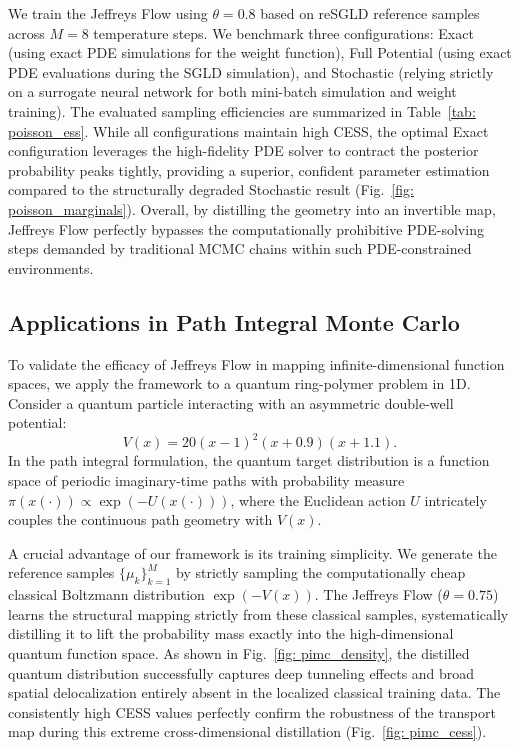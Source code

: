 \documentclass[%
 reprint,
 amsmath,amssymb,
 aps,
 pre,
]{revtex4-2}
\begin{document}
We train the Jeffreys Flow using $\theta = 0.8$ based on reSGLD reference samples across $M = 8$ temperature steps. We benchmark three configurations: Exact (using exact PDE simulations for the weight function), Full Potential (using exact PDE evaluations during the SGLD simulation), and Stochastic (relying strictly on a surrogate neural network for both mini-batch simulation and weight training). The evaluated sampling efficiencies are summarized in Table~\ref{tab: poisson_ess}. While all configurations maintain high CESS, the optimal Exact configuration leverages the high-fidelity PDE solver to contract the posterior probability peaks tightly, providing a superior, confident parameter estimation compared to the structurally degraded Stochastic result (Fig.~\ref{fig: poisson_marginals}). Overall, by distilling the geometry into an invertible map, Jeffreys Flow perfectly bypasses the computationally prohibitive PDE-solving steps demanded by traditional MCMC chains within such PDE-constrained environments.

\subsection{Applications in Path Integral Monte Carlo}

To validate the efficacy of Jeffreys Flow in mapping infinite-dimensional function spaces, we apply the framework to a quantum ring-polymer problem in 1D. Consider a quantum particle interacting with an asymmetric double-well potential:
\begin{equation*}
	V(x) = 20(x - 1)^2 (x + 0.9)(x + 1.1).
\end{equation*}
In the path integral formulation, the quantum target distribution is a function space of periodic imaginary-time paths with probability measure $\pi(x(\cdot)) \propto \exp(-U(x(\cdot)))$, where the Euclidean action $U$ intricately couples the continuous path geometry with $V(x)$. 

A crucial advantage of our framework is its training simplicity. We generate the reference samples $\{\mu_k\}_{k=1}^M$ by strictly sampling the computationally cheap classical Boltzmann distribution $\exp(-V(x))$. The Jeffreys Flow ($\theta = 0.75$) learns the structural mapping strictly from these classical samples, systematically distilling it to lift the probability mass exactly into the high-dimensional quantum function space. As shown in Fig.~\ref{fig: pimc_density}, the distilled quantum distribution successfully captures deep tunneling effects and broad spatial delocalization entirely absent in the localized classical training data. The consistently high CESS values perfectly confirm the robustness of the transport map during this extreme cross-dimensional distillation (Fig.~\ref{fig: pimc_cess}).
\end{document}
